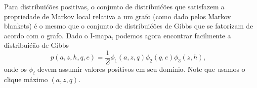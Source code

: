 \begin{exenumerate}
\begin{solution}
\begin{figure}[h]
\begin{center}
{
                    \vspace{3ex}
                    \vspace{3ex}
                    }
            \end{center}
        \end{figure}
        
        Para distribui\'c\~oes positivas, o conjunto de distribui\'c\~oes que satisfazem a propriedade de Markov local relativa a um grafo (como dado pelos Markov blankets) \'e o mesmo que o conjunto de distribui\'c\~oes de Gibbs que se fatorizam de acordo com o grafo. Dado o I-mapa, podemos agora encontrar facilmente a distribui\'c\~ao de Gibbs
        $$p(a,z,h,q,e) = \frac{1}{Z} \phi_1(a,z,q) \phi_2(q,e) \phi_3(z,h),$$
        onde os $\phi_i$ devem assumir valores positivos em seu dom\'inio. Note que usamos o clique m\'aximo $(a,z,q)$.
        
    \end{solution}
\end{exenumerate}


